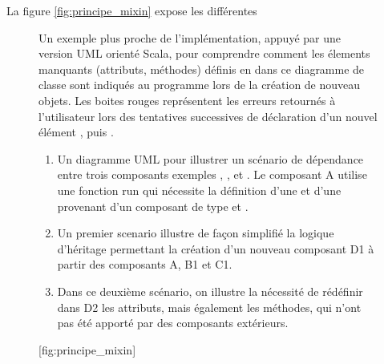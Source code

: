 La figure \ref{fig:principe_mixin} expose les différentes

\begin{figure}[!htbp]
	\begin{sidecaption}[fortoc]{Un exemple plus proche de l'implémentation, appuyé par une version UML orienté Scala, pour comprendre comment les élements manquants (attributs, méthodes) définis en  dans ce diagramme de classe sont indiqués au programme lors de la création de nouveau objets. Les boites rouges représentent les erreurs retournés à l'utilisateur lors des tentatives successives de déclaration d'un nouvel élément , puis . \parbox{\marginparwidth}{
\begin{enumerate}[label=(\alph*),labelindent=\parindent,leftmargin=*]
       \item Un diagramme UML pour illustrer un scénario de dépendance entre trois composants exemples , , et . Le composant A utilise une fonction run qui nécessite la définition d'une  et d'une  provenant d'un composant de type  et .
       \item Un premier scenario illustre de façon simplifié la logique d'héritage permettant la création d'un nouveau composant D1 à partir des composants A, B1 et C1.
       \item Dans ce deuxième scénario, on illustre la nécessité de rédéfinir dans D2 les attributs, mais également les méthodes, qui n'ont pas été apporté par des composants extérieurs.
\end{enumerate}}}[fig:principe_mixin]
	\centering
	\end{sidecaption}
\end{figure}



